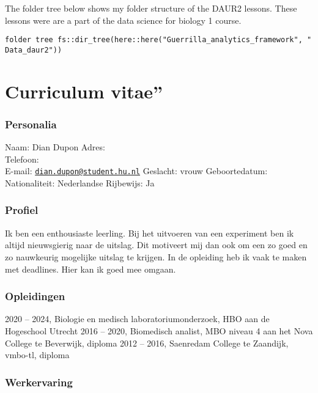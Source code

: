 \documentclass[
]{book}
\begin{document}
The folder tree below shows my folder structure of the DAUR2 lessons. These lessons were are a part of the data science for biology 1 course.

\texttt{folder\ tree\ fs::dir\_tree(here::here("Guerrilla\_analytics\_framework",\ "Data\_daur2"))}

\hypertarget{curriculum-vitae}{%
\chapter{Curriculum vitae''}\label{curriculum-vitae}}

\hypertarget{personalia}{%
\subsection{Personalia}\label{personalia}}

Naam: Dian Dupon
Adres: \\
Telefoon: \\
E-mail: \href{mailto:dian.dupon@student.hu.nl}{\nolinkurl{dian.dupon@student.hu.nl}}
Geslacht: vrouw
Geboortedatum:
Nationaliteit: Nederlandse
Rijbewijs: Ja

\hypertarget{profiel}{%
\subsection{Profiel}\label{profiel}}

Ik ben een enthousiaste leerling. Bij het uitvoeren van een experiment ben ik altijd nieuwsgierig naar de uitslag. Dit motiveert mij dan ook om een zo goed en zo nauwkeurig mogelijke uitslag te krijgen. In de opleiding heb ik vaak te maken met deadlines. Hier kan ik goed mee omgaan.

\hypertarget{opleidingen}{%
\subsection{Opleidingen}\label{opleidingen}}

2020 -- 2024, Biologie en medisch laboratoriumonderzoek, HBO aan de Hogeschool Utrecht
2016 -- 2020, Biomedisch analist, MBO niveau 4 aan het Nova College te Beverwijk, diploma
2012 -- 2016, Saenredam College te Zaandijk, vmbo-tl, diploma

\hypertarget{werkervaring}{%
\subsection{Werkervaring}\label{werkervaring}}
\end{document}
